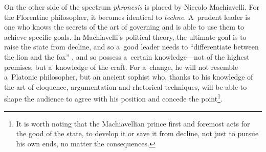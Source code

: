 On the other side of the spectrum \textit{phronesis} is placed by Niccolo Machiavelli. For the Florentine philosopher, it becomes identical to \textit{techne}. A~prudent leader is one who knows the secrets of the art of governing and is able to use them to achieve specific goals. In Machiavelli's political theory, the ultimate goal is to raise the state from decline, and so a~good leader needs to ``differentiate between the lion and the fox'' 
\parencite[][p.96]{machiavelli_prince_2003}, %
 and so possess a~certain knowledge---not of the highest premises, but a~knowledge of the craft. For a~change, he will not resemble a~Platonic philosopher, but an ancient sophist who, thanks to his knowledge of the art of eloquence, argumentation and rhetorical techniques, will be able to shape the audience to agree with his position and concede the point\footnote{It is worth noting that the Machiavellian prince first and foremost acts for the good of the state, to develop it or save it from decline, not just to pursue his own ends, no matter the consequences.}.



